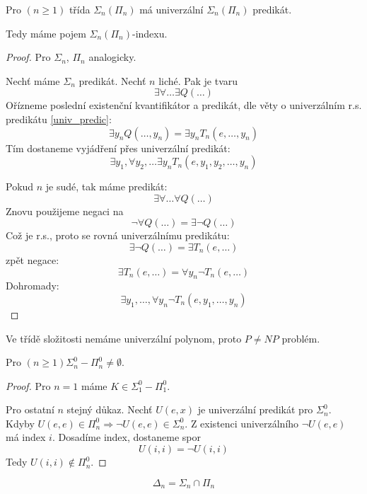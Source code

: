 \begin{theorem}\label{aritm_numer}
	Pro $(n \geq 1)$ třída $\Sigma_n(\Pi_n)$ má univerzální $\Sigma_n(\Pi_n)$ predikát.

	Tedy máme pojem $\Sigma_n(\Pi_n)$-indexu.
\end{theorem}
\begin{proof}
	Pro $\Sigma_n$, $\Pi_n$ analogicky.

	Nechť máme $\Sigma_n$ predikát.
	Nechť $n$ liché. Pak je tvaru
	\[ \exists \forall \ldots \exists Q(\ldots) \]
	Ořízneme poslední existenční kvantifikátor a predikát, dle věty o univerzálním r.s. predikátu \cref{univ_predic}:
	\[ \exists y_n Q(\ldots, y_n) = \exists y_n T_n(e, \ldots, y_n) \]
	Tím dostaneme vyjádření přes univerzální predikát:
	\[ \exists y_1, \forall y_2, \ldots \exists y_n T_n(e, y_1, y_2, \ldots, y_n) \]

	Pokud $n$ je sudé, tak máme predikát:
	\[ \exists \forall \ldots \forall Q(\ldots) \]
	Znovu použijeme negaci na
	\[ \neg \forall Q(\ldots) = \exists \neg Q(\ldots) \]
	Což je r.s., proto se rovná univerzálnímu predikátu:
	\[ \exists \neg Q(\ldots) = \exists T_n(e, \ldots) \]
	zpět negace:
	\[ \exists T_n(e, \ldots) = \forall y_n \neg T_n(e, \ldots) \]
	Dohromady:
	\[ \exists y_1, \ldots, \forall y_n \neg T_n(e, y_1, \ldots, y_n) \]
\end{proof}

\begin{note}
	Ve třídě složitosti nemáme univerzální polynom, proto $P \neq NP$ problém.
\end{note}

\begin{consequence}
	Pro $(n \geq 1) \Sigma_n^0 - \Pi_n^0 \neq \emptyset$.
\end{consequence}
\begin{proof}
	Pro $n = 1$ máme $K \in \Sigma_1^0 - \Pi_1^0$.

	Pro ostatní $n$ stejný důkaz.
	Nechť $U(e, x)$ je univerzální predikát pro $\Sigma_n^0$. Kdyby $U(e, e) \in \Pi_n^0 \Rightarrow \neg U(e, e) \in \Sigma_n^0$.
	Z existenci univerzálního $\neg U(e, e)$ má index $i$.
	Dosadíme index, dostaneme spor
	\[ U(i, i) = \neg U(i, i) \]
	Tedy $U(i, i) \notin \Pi_n^0$.
\end{proof}

\begin{definition}[$\Delta_n$]
	\[ \Delta_n = \Sigma_n \cap \Pi_n \]
\end{definition}

